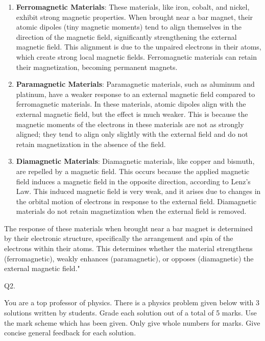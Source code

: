 \begin{enumerate}
    \item \textbf{Ferromagnetic Materials}: These materials, like iron, cobalt, and nickel, exhibit strong magnetic properties. When brought near a bar magnet, their atomic dipoles (tiny magnetic moments) tend to align themselves in the direction of the magnetic field, significantly strengthening the external magnetic field. This alignment is due to the unpaired electrons in their atoms, which create strong local magnetic fields. Ferromagnetic materials can retain their magnetization, becoming permanent magnets.
    
    \item \textbf{Paramagnetic Materials}: Paramagnetic materials, such as aluminum and platinum, have a weaker response to an external magnetic field compared to ferromagnetic materials. In these materials, atomic dipoles align with the external magnetic field, but the effect is much weaker. This is because the magnetic moments of the electrons in these materials are not as strongly aligned; they tend to align only slightly with the external field and do not retain magnetization in the absence of the field.
    
    \item \textbf{Diamagnetic Materials}: Diamagnetic materials, like copper and bismuth, are repelled by a magnetic field. This occurs because the applied magnetic field induces a magnetic field in the opposite direction, according to Lenz's Law. This induced magnetic field is very weak, and it arises due to changes in the orbital motion of electrons in response to the external field. Diamagnetic materials do not retain magnetization when the external field is removed.
\end{enumerate}

The response of these materials when brought near a bar magnet is determined by their electronic structure, specifically the arrangement and spin of the electrons within their atoms. This determines whether the material strengthens (ferromagnetic), weakly enhances (paramagnetic), or opposes (diamagnetic) the external magnetic field."



                           Q2. 

You are a top professor of physics. There is a physics problem given below with 3 solutions written by students. Grade each solution out of a total of 5 marks. Use the mark scheme which has been given. Only give whole numbers for marks. Give concise general feedback for each solution. 

